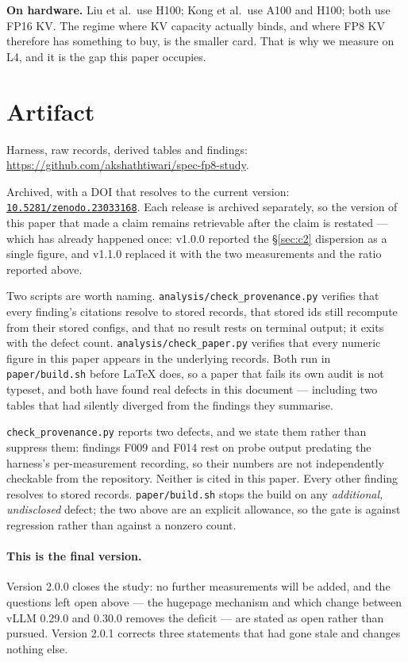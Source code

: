 \documentclass[11pt]{article}
\newcommand{\tw}[1]{\texttt{\small #1}}
\begin{document}
\textbf{On hardware.} Liu et al.\ use H100; Kong et al.\ use A100 and H100;
both use FP16 KV. The regime where KV capacity actually binds, and where FP8
KV therefore has something to buy, is the smaller card. That is why we
measure on L4, and it is the gap this paper occupies.

\section{Artifact}\label{sec:artifact}

Harness, raw records, derived tables and findings:
\url{https://github.com/akshathtiwari/spec-fp8-study}.

Archived, with a DOI that resolves to the current version:
\href{https://doi.org/10.5281/zenodo.23033168}{\tw{10.5281/zenodo.23033168}}. Each release is archived separately, so
the version of this paper that made a claim remains retrievable after the
claim is restated --- which has already happened once: v1.0.0 reported the
\S\ref{sec:c2} dispersion as a single figure, and v1.1.0 replaced it with the
two measurements and the ratio reported above.

Two scripts are worth naming. \tw{analysis/check\_provenance.py} verifies
that every finding's citations resolve to stored records, that stored ids
still recompute from their stored configs, and that no result rests on
terminal output; it exits with the defect count. \tw{analysis/check\_paper.py}
verifies that every numeric figure in this paper appears in the underlying
records. Both run in \tw{paper/build.sh} before \LaTeX{} does, so a paper
that fails its own audit is not typeset, and both have found real defects in
this document --- including two tables that had silently diverged from the
findings they summarise.

\tw{check\_provenance.py} reports two defects, and we state them rather
than suppress them: findings F009 and F014 rest on probe output predating
the harness's per-measurement recording, so their numbers are not
independently checkable from the repository. Neither is cited in this paper.
Every other finding resolves to stored records.
\tw{paper/build.sh} stops the build on any \emph{additional, undisclosed}
defect; the two above are an explicit allowance, so the gate is against
regression rather than against a nonzero count.

\paragraph{This is the final version.} Version 2.0.0 closes the study: no
further measurements will be added, and the questions left open above --- the
hugepage mechanism and which change between vLLM 0.29.0 and 0.30.0 removes
the deficit --- are stated as open rather than pursued. Version 2.0.1 corrects
three statements that had gone stale and changes nothing else.
\end{document}

